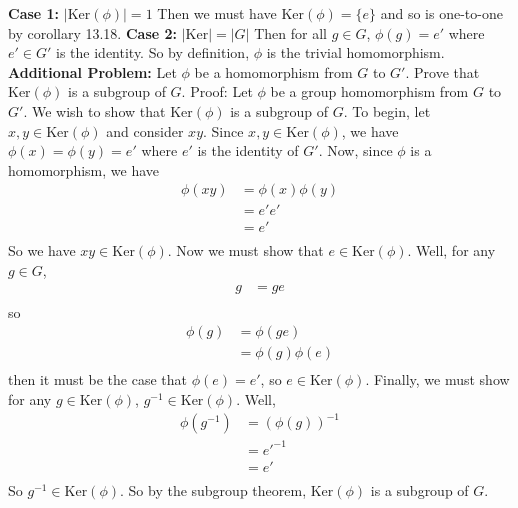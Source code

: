 \documentclass{article}
\begin{document}
\newline\newline
\textbf{Case 1:} $|\text{Ker}(\phi)| = 1$
\newline
Then we must have $\text{Ker}(\phi) = \{e\}$ and so is one-to-one by corollary 13.18.
\newline\newline
\textbf{Case 2:} $|\text{Ker}| = |G|$
\newline
Then for all $g \in G$, $\phi(g) = e'$ where $e' \in G'$ is the identity. So by definition, $\phi$ is the trivial homomorphism.
\newline\newline\newline
\textbf{Additional Problem:} Let $\phi$ be a homomorphism from $G$ to $G'$. Prove that $\text{Ker}(\phi)$ is a subgroup of $G$.
\newline\newline
Proof: Let $\phi$ be a group homomorphism from $G$ to $G'$. We wish to show that $\text{Ker}(\phi)$ is a subgroup of $G$. To begin, let $x,y \in \text{Ker}(\phi)$ and consider $xy$. Since $x,y \in \text{Ker}(\phi)$, we have $\phi(x) = \phi(y) = e'$ where  $e'$ is the identity of $G'$. Now, since $\phi$ is a homomorphism, we have
\begin{align*}
    \phi(xy) &= \phi(x)\phi(y) \\
    &= e'e' \\
    &= e' \\
\end{align*}
So we have $xy \in \text{Ker}(\phi)$. Now we must show that $e \in \text{Ker}(\phi)$. Well, for any $g \in G$,
\begin{align*}
    g &= ge\\
\end{align*}
so
\begin{align*}
    \phi(g) &= \phi(ge) \\
    &= \phi(g)\phi(e) \\
\end{align*}
then it must be the case that $\phi(e) = e'$, so $e \in \text{Ker}(\phi)$. Finally, we must show for any $g \in \text{Ker}(\phi)$, $g^{-1} \in \text{Ker}(\phi)$. Well, 
\begin{align*}
    \phi(g^{-1}) &= (\phi(g))^{-1} \\
    &= e'^{-1} \\
    &= e' \\
\end{align*}
So $g^{-1} \in \text{Ker}(\phi)$. So by the subgroup theorem, $\text{Ker}(\phi)$ is a subgroup of $G$.
\end{document}
